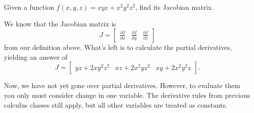 \begin{example}
    Given a function $f(x, y, z) = xyz + x^{2}y^{2}z^{2}$, find its Jacobian matrix.

    \begin{soln}
        We know that the Jacobian matrix is
        \[J = \begin{bmatrix}
            \frac{\partial f}{\partial x} & \frac{\partial f}{\partial y} & \frac{\partial f}{\partial z}
        \end{bmatrix}\]
        from our definition above. What's left is to calculate the partial derivatives, yielding an answer of
        \[J = \begin{bmatrix}
            yz + 2xy^{2}z^{2} & xz + 2x^{2}yz^{2} & xy + 2x^{2}y^{2}z
        \end{bmatrix}.\]
    \end{soln}
\end{example}

\begin{remark}
    Now, we have not yet gone over partial derivatives. However, to evaluate them you only must consider change in one variable. The derivative rules from previous calculus classes still apply, but all other variables are treated as constants.
\end{remark}